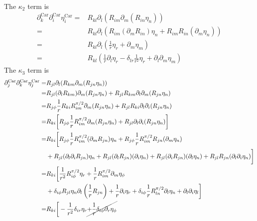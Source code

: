 \documentclass[aps,prl,preprint]{revtex4-2}
\begin{document}
The $\kappa_2$ term is
\begin{align}
    \partial_k^\text{Car}\partial_i^\text{Car}\eta_i^\text{Car}
    = & R_{kl}\partial_l(R_{im}\partial_m(R_{in}\eta_n))                                  \\
    = & R_{kl}\partial_l(R_{im}(\partial_mR_{in})\eta_n + R_{im}R_{in}(\partial_m\eta_n)) \\
    = & R_{kl}\partial_l\left(\frac{1}{r}\eta_r + \partial_m\eta_m\right)                 \\
    = & R_{kl}\left(\frac{1}{r}\partial_l\eta_r - \delta_{lr}\frac{1}{r^2}\eta_r
    + \partial_l\partial_m\eta_m\right)
\end{align}
The $\kappa_3$ term is
\begin{align}
    \partial_j^\text{Car}\partial_k^\text{Car}\eta_j^\text{Car}
    = & R_{jl}\partial_l(R_{km}\partial_m(R_{jn}\eta_n))                                                             \\
    = & R_{jl}(\partial_lR_{km})\partial_m(R_{jn}\eta_n) + R_{jl}R_{km}\partial_l\partial_m(R_{jn}\eta_n)            \\
    = & R_{j\phi}\frac{1}{r}R_{ki}R^{\pi/2}_{im}\partial_m(R_{jn}\eta_n)
    + R_{jl}R_{ki}\partial_l\partial_i(R_{jn}\eta_n)                                                                 \\
    = & R_{ki}\bigg[R_{j\phi}\frac{1}{r}R^{\pi/2}_{im}\partial_m(R_{jn}\eta_n)
    + R_{jl}\partial_l\partial_i(R_{jn}\eta_n)\bigg]                                                                 \\
    = & R_{ki}\bigg[R_{j\phi}\frac{1}{r}R^{\pi/2}_{im}(\partial_mR_{jn})\eta_n
    +R_{j\phi}\frac{1}{r}R^{\pi/2}_{im}R_{jn}(\partial_m\eta_n)                                                      \\
      & +R_{jl}(\partial_l\partial_iR_{jn})\eta_n+R_{jl}(\partial_lR_{jn})(\partial_i\eta_n)
    +R_{jl}(\partial_iR_{jn})(\partial_l\eta_n)+R_{jl}R_{jn}(\partial_l\partial_i\eta_n)\bigg]\nonumber              \\
    = & R_{ki}\bigg[\frac{1}{r^2}R^{\pi/2}_{i\phi}\eta_r+\frac{1}{r}R^{\pi/2}_{im}\partial_m\eta_\phi\nonumber       \\
      & +\delta_{i\phi}R_{jl}\eta_n\partial_l\left(\frac{1}{r}R_{jn}\right) + \frac{1}{r}\partial_i\eta_r
    +\delta_{i\phi}\frac{1}{r}R^{\pi/2}_{ln}\partial_l\eta_n + \partial_l\partial_i\eta_l\bigg]\nonumber             \\
    = & R_{ki}\bigg[-\frac{1}{r^2}\delta_{ir}\eta_r \cancel{+ \frac{1}{r}\delta_{i\phi}\partial_r\eta_\phi}

\end{align}
\end{document}

